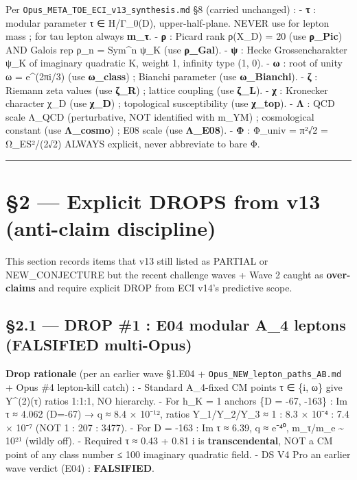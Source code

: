 \documentclass[
  11pt,
  a4paper,
]{article}
\begin{document}
Per \texttt{Opus\_META\_TOE\_ECI\_v13\_synthesis.md} §8 (carried unchanged) :
- \textbf{τ} : modular parameter τ ∈ H/Γ\_0(\textbar D\textbar), upper-half-plane. NEVER use for lepton mass ; for tau lepton always \textbf{m\_τ}.
- \textbf{ρ} : Picard rank ρ(X\_D) = 20 (use \textbf{ρ\_Pic}) AND Galois rep ρ\_n = Sym\^{}n ψ\_K (use \textbf{ρ\_Gal}).
- \textbf{ψ} : Hecke Grossencharakter ψ\_K of imaginary quadratic K, weight 1, infinity type (1, 0).
- \textbf{ω} : root of unity ω = e\^{}(2πi/3) (use \textbf{ω\_class}) ; Bianchi parameter (use \textbf{ω\_Bianchi}).
- \textbf{ζ} : Riemann zeta values (use \textbf{ζ\_R}) ; lattice coupling (use \textbf{ζ\_L}).
- \textbf{χ} : Kronecker character χ\_D (use \textbf{χ\_D}) ; topological susceptibility (use \textbf{χ\_top}).
- \textbf{Λ} : QCD scale Λ\_QCD (perturbative, NOT identified with m\_YM) ; cosmological constant (use \textbf{Λ\_cosmo}) ; E08 scale (use \textbf{Λ\_E08}).
- \textbf{Φ} : Φ\_univ = π²√2 = Ω\_ES²/(2√2) ALWAYS explicit, never abbreviate to bare Φ.

\begin{center}\rule{0.5\linewidth}{0.5pt}\end{center}

\hypertarget{explicit-drops-from-v13-anti-claim-discipline}{%
\section{§2 --- Explicit DROPS from v13 (anti-claim discipline)}\label{explicit-drops-from-v13-anti-claim-discipline}}

This section records items that v13 still listed as PARTIAL or NEW\_CONJECTURE but the recent challenge waves + Wave 2 caught as \textbf{over-claims} and require explicit DROP from ECI v14's predictive scope.

\hypertarget{drop-1-e04-modular-a_4-leptons-falsified-multi-opus}{%
\subsection{§2.1 --- DROP \#1 : E04 modular A\_4 leptons (FALSIFIED multi-Opus)}\label{drop-1-e04-modular-a_4-leptons-falsified-multi-opus}}

\textbf{Drop rationale} (per an earlier wave §1.E04 + \texttt{Opus\_NEW\_lepton\_paths\_AB.md} + Opus \#4 lepton-kill catch) :
- Standard A\_4-fixed CM points τ ∈ \{i, ω\} give Y\^{}(2)(τ) ratios 1:1:1, NO hierarchy.
- For h\_K = 1 anchors \{D = -67, -163\} : Im τ ≈ 4.062 (D=-67) → q ≈ 8.4 × 10⁻¹², ratios \textbar Y\_1/Y\_2/Y\_3\textbar{} ≈ 1 : 8.3 × 10⁻⁴ : 7.4 × 10⁻⁷ (NOT 1 : 207 : 3477).
- For D = -163 : Im τ ≈ 6.39, q ≈ e⁻⁴⁰, m\_τ/m\_e \textasciitilde{} 10²¹ (wildly off).
- Required τ ≈ 0.43 + 0.81 i is \textbf{transcendental}, NOT a CM point of any class number ≤ 100 imaginary quadratic field.
- DS V4 Pro an earlier wave verdict (E04) : \textbf{FALSIFIED}.
\end{document}
